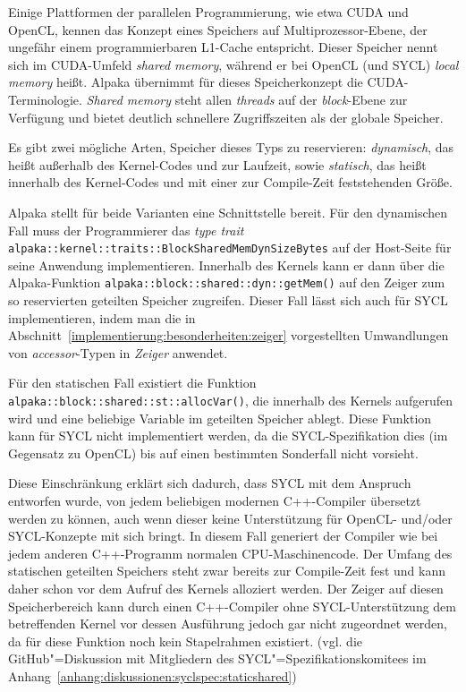 Einige Plattformen der parallelen Programmierung, wie etwa CUDA und OpenCL,
kennen das Konzept eines Speichers auf Multiprozessor-Ebene, der ungefähr
einem programmierbaren L1-Cache entspricht. Dieser Speicher nennt sich im
CUDA-Umfeld \textit{shared memory}, während er bei OpenCL (und SYCL)
\textit{local memory} heißt. Alpaka übernimmt für dieses Speicherkonzept die
CUDA-Terminologie. \textit{Shared memory} steht allen \textit{threads} auf
der \textit{block}-Ebene zur Verfügung und bietet deutlich schnellere
Zugriffszeiten als der globale Speicher.

Es gibt zwei mögliche Arten, Speicher dieses Typs zu reservieren:
\textit{dynamisch}, das heißt außerhalb des Kernel-Codes und zur Laufzeit, sowie
\textit{statisch}, das heißt innerhalb des Kernel-Codes und mit einer zur
Compile-Zeit feststehenden Größe.

Alpaka stellt für beide Varianten eine Schnittstelle bereit. Für den dynamischen
Fall muss der Programmierer das \textit{type trait}
\texttt{alpaka::kernel::traits::BlockSharedMemDynSizeBytes} auf der Host-Seite
für seine Anwendung implementieren. Innerhalb des Kernels kann er dann über die
Alpaka-Funktion \texttt{alpaka::block::shared::dyn::getMem()} auf den Zeiger
zum so reservierten geteilten Speicher zugreifen. Dieser Fall lässt sich auch
für SYCL implementieren, indem man die in
Abschnitt~\ref{implementierung:besonderheiten:zeiger} vorgestellten
Umwandlungen von \textit{accessor}-Typen in \textit{Zeiger} anwendet.

Für den statischen Fall existiert die Funktion
\texttt{alpaka::block::shared::st::allocVar()}, die innerhalb des Kernels
aufgerufen wird und eine beliebige Variable im geteilten Speicher ablegt. Diese
Funktion kann für SYCL nicht implementiert werden, da die SYCL-Spezifikation
dies (im Gegensatz zu OpenCL) bis auf einen bestimmten Sonderfall
\cite[siehe][Abschnitt 4.8.5.3]{sycl2019} nicht vorsieht.

Diese Einschränkung erklärt sich dadurch, dass SYCL mit dem Anspruch entworfen
wurde, von jedem beliebigen modernen C++-Compiler übersetzt werden zu können,
auch wenn dieser keine Unterstützung für OpenCL- und/oder SYCL-Konzepte mit sich
bringt. In diesem Fall generiert der Compiler wie bei jedem anderen C++-Programm
normalen CPU-Maschinencode. Der Umfang des statischen geteilten Speichers steht
zwar bereits zur Compile-Zeit fest und kann daher schon vor dem Aufruf des
Kernels alloziert werden. Der Zeiger auf diesen Speicherbereich kann durch einen
C++-Compiler ohne SYCL-Unterstützung dem betreffenden Kernel vor dessen
Ausführung jedoch gar nicht zugeordnet werden, da für diese Funktion noch kein
Stapelrahmen existiert. (vgl. die GitHub"=Diskussion mit Mitgliedern des
SYCL"=Spezifikationskomitees im
Anhang~\ref{anhang:diskussionen:syclspec:staticshared})

